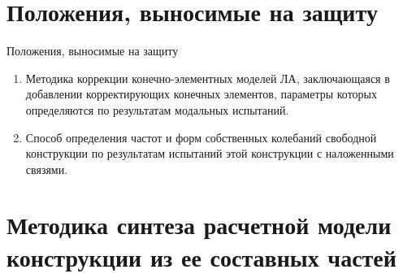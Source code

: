 \section{Положения, выносимые на защиту}

\begin{frame}{Положения, выносимые на защиту}
	\begin{enumerate}
		\item Методика коррекции конечно-элементных моделей ЛА, заключающаяся в добавлении корректирующих конечных элементов, параметры которых определяются по результатам модальных испытаний.
		\item Способ определения частот и форм собственных колебаний свободной конструкции по результатам испытаний этой конструкции с наложенными связями.
	\end{enumerate}
\end{frame}

\section{Методика синтеза расчетной модели конструкции из ее составных частей}

